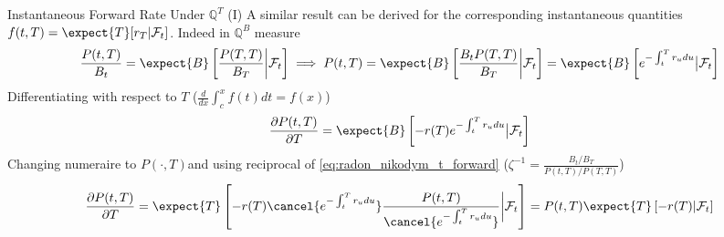 \documentclass{beamer}
\begin{document}
	\begin{frame}{Instantaneous Forward Rate Under $\mathbb{Q}^T$ (I)}
		A similar result can be derived for the corresponding instantaneous quantities
		$f(t,T)=\expect{T}[r_T|\mathcal{F}_t]$. Indeed in $\mathbb{Q}^B$ measure
		\begin{equation*}
			\frac{P(t,T)}{B_t}=\expect{B}\left[\frac{P(T,T)}{B_T}\bigg|\mathcal{F}_t\right] \implies
			P(t,T)=\expect{B}\left[\frac{B_tP(T,T)}{B_T}\bigg|\mathcal{F}_t\right]=\expect{B}\left[e^{-\int_t^Tr_u du}\big|\mathcal{F}_t\right]
		\end{equation*}
		Differentiating with respect to $T$ ($\frac{d}{dx}\int_c^x f(t)dt=f(x)$)
		\begin{equation*}
			\frac{\partial P(t,T)}{\partial T}=
			\expect{B}\left[-r(T)e^{-\int_t^Tr_u du}\big|\mathcal{F}_t\right]
		\end{equation*}
		Changing numeraire to $P(\cdot,T)$and using reciprocal of \cref{eq:radon_nikodym_t_forward} ($\zeta^{-1}=\frac{B_t/B_T}{P(t,T)/P(T,T)}$)
		\begin{equation*}
			\frac{\partial P(t,T)}{\partial T}=
			\expect{T}\left[-r(T)\cancel{e^{-\int_t^Tr_u du}}\frac{P(t,T)}{\cancel{e^{-\int_t^Tr_u du}}}\bigg|\mathcal{F}_t\right]=
			P(t,T)\expect{T}\left[-r(T)|\mathcal{F}_t\right]
		\end{equation*}
	\end{frame}
\end{document}
